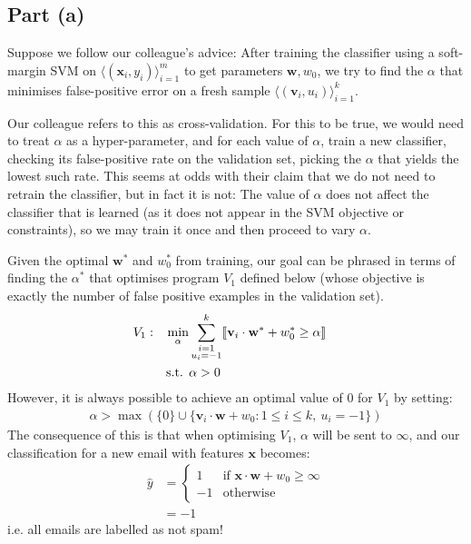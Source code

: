 \subsection{Part (a)}

Suppose we follow our colleague's advice: After training the classifier using a soft-margin SVM on $\langle(\mathbf{x}_i,y_i)\rangle_{i=1}^m$ to get parameters $\mathbf{w}, w_0$, we try to find the $\alpha$ that minimises false-positive error on a fresh sample $\langle(\mathbf{v}_i,u_i)\rangle_{i=1}^k$.

Our colleague refers to this as cross-validation. For this to be true, we would need to treat $\alpha$ as a hyper-parameter, and for each value of $\alpha$, train a new classifier, checking its false-positive rate on the validation set, picking the $\alpha$ that yields the lowest such rate. This seems at odds with their claim that we do not need to retrain the classifier, but in fact it is not: The value of $\alpha$ does not affect the classifier that is learned (as it does not appear in the SVM objective or constraints), so we may train it once and then proceed to vary $\alpha$.

Given the optimal $\mathbf{w}^\ast$ and $w_0^\ast$ from training, our goal can be phrased in terms of finding the $\alpha^\ast$ that optimises program $V_1$ defined below (whose objective is exactly the number of false positive examples in the validation set).
\begin{align*}
  V_1: && \min_{\alpha} & \sum_{\substack{i=1\\u_i=-1}}^k\llbracket \mathbf{v}_i\cdot\mathbf{w}^\ast+w_0^\ast\geq\alpha \rrbracket &&
  \\   && \text{s.t. } & \alpha > 0 &&
\end{align*}
However, it is always possible to achieve an optimal value of $0$ for $V_1$ by setting:
\begin{align*}
  \alpha > \max(\{0\}\cup\{\mathbf{v}_i\cdot\mathbf{w}+w_0:1\leq i\leq k,~u_i=-1\})
\end{align*}
The consequence of this is that when optimising $V_1$, $\alpha$ will be sent to $\infty$, and our classification for a new email with features $\mathbf{x}$ becomes:
\begin{align*}
  \widehat{y} & =
  \begin{cases}
    1 & \text{if }\mathbf{x}\cdot\mathbf{w} + w_0\geq\infty\\
    -1 & \text{otherwise}
  \end{cases}
  \\ & = -1
\end{align*}
i.e. all emails are labelled as not spam!

